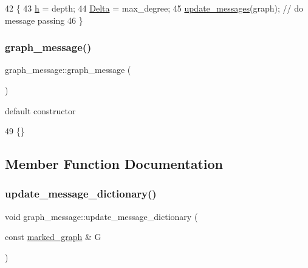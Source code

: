 \begin{DoxyCode}
42                                                                      \{
43     \hyperlink{classgraph__message_a934d63ed7275c211e13c6fb68824ed46}{h} = depth;
44     \hyperlink{classgraph__message_a45dfd061b7bc73572e5132fbf66efd55}{Delta} = max\_degree;
45     \hyperlink{classgraph__message_a40dadc59d582b290202e79bc4a9e896c}{update\_messages}(graph); \textcolor{comment}{// do message passing}
46   \}
\end{DoxyCode}
\mbox{\label{classgraph__message_aa21140453eb0e1de98a2ddfcf2832aeb}} 
\subsubsection{\texorpdfstring{graph\+\_\+message()}{graph\_message()}\hspace{0.1cm}{\footnotesize\ttfamily [2/2]}}
{\footnotesize\ttfamily graph\+\_\+message\+::graph\+\_\+message (\begin{DoxyParamCaption}{ }\end{DoxyParamCaption})\hspace{0.3cm}{\ttfamily [inline]}}



default constructor 


\begin{DoxyCode}
49 \{\}
\end{DoxyCode}


\subsection{Member Function Documentation}
\mbox{\label{classgraph__message_a77d137b371134e292283fdd78634f4d4}} 
\subsubsection{\texorpdfstring{update\+\_\+message\+\_\+dictionary()}{update\_message\_dictionary()}}
{\footnotesize\ttfamily void graph\+\_\+message\+::update\+\_\+message\+\_\+dictionary (\begin{DoxyParamCaption}\item[{const \hyperlink{classmarked__graph}{marked\+\_\+graph} \&}]{G }\end{DoxyParamCaption})\hspace{0.3cm}{\ttfamily [private]}}



